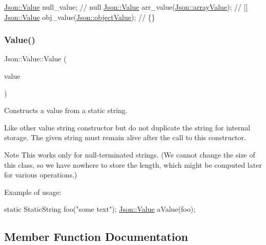 \begin{DoxyCode}
\hyperlink{classJson_1_1Value}{Json::Value} null\_value; \textcolor{comment}{// null}
\hyperlink{classJson_1_1Value}{Json::Value} arr\_value(\hyperlink{namespaceJson_a7d654b75c16a57007925868e38212b4eadc8f264f36b55b063c78126b335415f4}{Json::arrayValue}); \textcolor{comment}{// []}
\hyperlink{classJson_1_1Value}{Json::Value} obj\_value(\hyperlink{namespaceJson_a7d654b75c16a57007925868e38212b4eae8386dcfc36d1ae897745f7b4f77a1f6}{Json::objectValue}); \textcolor{comment}{// \{\}}
\end{DoxyCode}
 \mbox{\label{classJson_1_1Value_a081830e95f88a37054da7e46c65b0766}} 
\subsubsection{\texorpdfstring{Value()}{Value()}\hspace{0.1cm}{\footnotesize\ttfamily [2/2]}}
{\footnotesize\ttfamily Json\+::\+Value\+::\+Value (\begin{DoxyParamCaption}\item[{const \hyperlink{classJson_1_1StaticString}{Static\+String} \&}]{value }\end{DoxyParamCaption})}



Constructs a value from a static string. 

Like other value string constructor but do not duplicate the string for internal storage. The given string must remain alive after the call to this constructor. \begin{DoxyNote}{Note}
This works only for null-\/terminated strings. (We cannot change the size of this class, so we have nowhere to store the length, which might be computed later for various operations.)
\end{DoxyNote}
Example of usage\+: 
\begin{DoxyCode}
\textcolor{keyword}{static} StaticString foo(\textcolor{stringliteral}{"some text"});
\hyperlink{classJson_1_1Value}{Json::Value} aValue(foo);
\end{DoxyCode}
 

\subsection{Member Function Documentation}
\mbox{\label{classJson_1_1Value_a7e49ac977e4bcf59745a09d426669f75}} 
